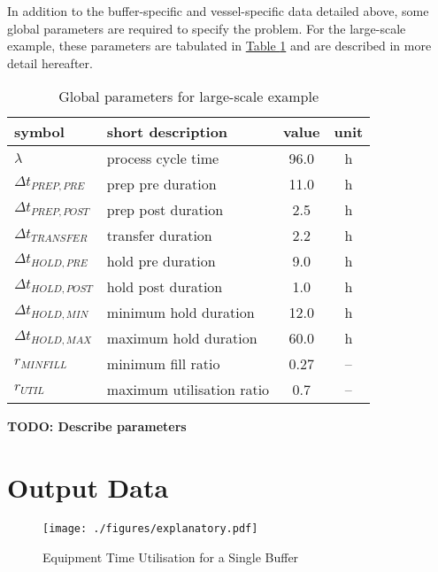 In addition to the buffer-specific and vessel-specific data detailed above,
some global parameters are required to specify the problem.
For the large-scale example, these parameters are tabulated in
\hyperref[tbl.parameters]{Table \ref*{tbl.parameters}} and are described in
more detail hereafter.
\begin{table}[h!]
    \centering
    \caption{Global parameters for large-scale example}
    \label{tbl.parameters}
    \begin{tabular}{l | l | c | c}
        symbol & short description & value & unit\\ \hline
        $\lambda$ & process cycle time & 96.0 & h\\
        $\Delta t_{\mathit{PREP,PRE}}$ & prep pre duration & 11.0 & h\\
        $\Delta t_{\mathit{PREP,POST}}$ & prep post duration & 2.5 & h\\
        $\Delta t_{\mathit{TRANSFER}}$ & transfer duration & 2.2 & h\\
        $\Delta t_{\mathit{HOLD,PRE}}$ & hold pre duration & 9.0 & h\\
        $\Delta t_{\mathit{HOLD,POST}}$ & hold post duration & 1.0 & h\\
        $\Delta t_{\mathit{HOLD,MIN}}$ & minimum hold duration & 12.0 & h\\
        $\Delta t_{\mathit{HOLD,MAX}}$ & maximum hold duration & 60.0 & h\\
        $r_{\mathit{MINFILL}}$ & minimum fill ratio & 0.27 & --\\
        $r_{\mathit{UTIL}}$ & maximum utilisation ratio & 0.7 & --\\
    \end{tabular}
\end{table}

\textbf{TODO: Describe parameters}

\section{Output Data}\label{S.outputdata}

\begin{figure}
    \centering
    \texttt{[image: ./figures/explanatory.pdf]}
    \caption{Equipment Time Utilisation for a Single Buffer}
    \label{fig.explanatory}
\end{figure}
